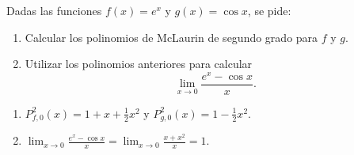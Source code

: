 {Dadas las funciones
$f(x)=e^x$ y $g(x)=\cos x$, se pide:
\begin{enumerate}
   \item  Calcular los polinomios de McLaurin de segundo grado para $f$
   y $g$.

   \item  Utilizar los polinomios anteriores para calcular
   \[ \lim_{x\rightarrow 0}\frac{e^x-\cos x}{x}.\]
\end{enumerate}
}
{\begin{enumerate}
\item $P^2_{f,0}(x) = 1+x+\frac{1}{2}x^2$ y $P^2_{g,0}(x) = 1-\frac{1}{2}x^2$.
\item $\lim_{x\rightarrow 0}\frac{e^x-\cos x}{x} = \lim_{x\rightarrow 0}\frac{x+x^2}{x} = 1$. 
\end{enumerate}
}
{
}


